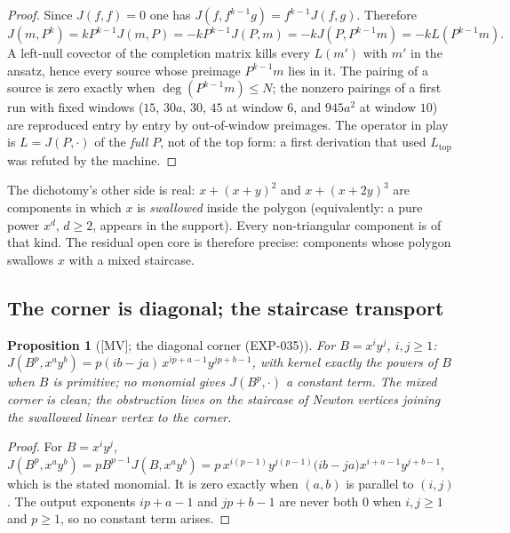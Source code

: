 \documentclass[11pt]{article}
\newtheorem{proposition}[theorem]{Proposition}
\theoremstyle{remark}
\begin{document}
\begin{proof}
Since $J(f,f)=0$ one has $J(f,f^{k-1}g)=f^{k-1}J(f,g)$. Therefore
\begin{equation}\label{eq:leibniz}
J(m,P^k)=kP^{k-1}J(m,P)=-kP^{k-1}J(P,m)=-kJ(P,P^{k-1}m)=-kL(P^{k-1}m).
\end{equation}
A left-null covector of the completion matrix
kills every $L(m')$ with $m'$ in the ansatz, hence every source whose preimage $P^{k-1}m$ lies in it. The pairing of a
source is zero exactly when $\deg(P^{k-1}m)\le N$; the nonzero pairings of a first run with fixed windows ($15$, $30a$, $30$, $45$
at window $6$, and $945a^2$ at window $10$) are reproduced entry by entry by out-of-window preimages. The operator in play is
$L=J(P,\cdot)$ of the \emph{full} $P$, not of the top form: a first derivation that used $L_{\mathrm{top}}$ was refuted by the machine.
\end{proof}

The dichotomy's other side is real: $x + (x+y)^2$ and $x + (x+2y)^3$ are components in which
$x$ is \emph{swallowed} inside the polygon (equivalently: a pure power $x^d$, $d \ge 2$,
appears in the support). Every non-triangular component is of that kind. The residual open
core is therefore precise: components whose polygon swallows $x$ with a mixed staircase.
\subsection{The corner is diagonal; the staircase transport}\label{sec:staircase}

\begin{proposition}[{[MV]}; the diagonal corner (EXP-035)]
For $B = x^i y^j$, $i, j \ge 1$:
$J(B^p, x^a y^b) = p (ib - ja)\, x^{ip + a - 1} y^{jp + b - 1}$, with kernel exactly the
powers of $B$ when $B$ is primitive; no monomial gives $J(B^p, \cdot)$ a constant term. The mixed corner is clean;
the obstruction lives on the staircase of Newton vertices joining the swallowed linear
vertex to the corner.
\end{proposition}

\begin{proof}
For $B=x^iy^j$, $J(B^p,x^ay^b)=pB^{p-1}J(B,x^ay^b)=p\,x^{i(p-1)}y^{j(p-1)}\bigl(ib-ja\bigr)x^{i+a-1}y^{j+b-1}$, which is the stated monomial. It is zero exactly when $(a,b)$ is parallel to $(i,j)$. The output exponents $ip+a-1$ and $jp+b-1$ are never both $0$ when $i,j\ge1$ and $p\ge1$, so no constant term arises.
\end{proof}
\end{document}
